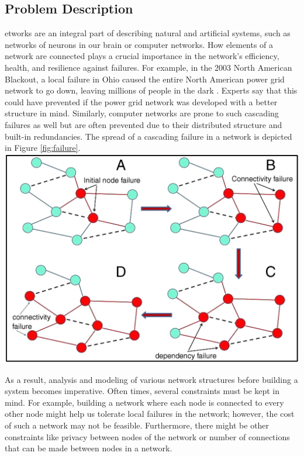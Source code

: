 \documentclass[journal]{IEEEtran}
\begin{document}
\subsection{Problem Description}
\lowercase{etworks} are an integral part of describing natural and artificial systems, such as networks of neurons in our brain or computer networks. How elements of a network are connected plays a crucial importance in the network's efficiency, health, and resilience against failures. For example, in the 2003 North American Blackout, a local failure in Ohio caused the entire North American power grid network to go down, leaving millions of people in the dark \cite[]{blackout}. Experts say that this could have prevented if the power grid network was developed with a better structure in mind. Similarly, computer networks are prone to such cascading failures as well but are often prevented due to their distributed structure and built-in redundancies. The spread of a cascading failure in a network is depicted in Figure \ref{fig:failure}. \\

\begingroup
    \centering
    \medskip
    \includegraphics[width=\columnwidth]{images/failure.jpg}
    \label{fig:failure}
    \medskip
\endgroup

\noindent As a result, analysis and modeling of various network structures before building a system becomes imperative. Often times, several constraints must be kept in mind. For example, building a network where each node is connected to every other node might help us tolerate local failures in the network; however, the cost of such a network may not be feasible. Furthermore, there might be other constraints like privacy between nodes of the network or number of connections that can be made between nodes in a network.\\
\end{document}
